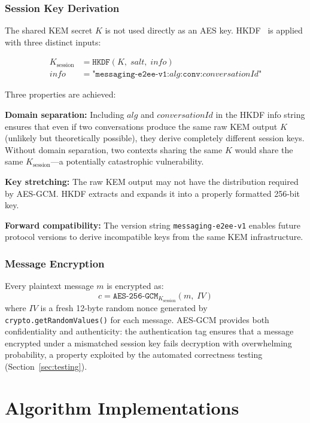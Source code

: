 \documentclass[12pt,a4paper]{report}
\begin{document}
\subsection{Session Key Derivation}

The shared KEM secret $K$ is not used directly as an AES key. HKDF~\cite{webcrypto}
is applied with three distinct inputs:

\begin{align}
K_{\text{session}} &= \texttt{HKDF}(K,\; \mathit{salt},\; \mathit{info}) \\
\mathit{info} &= \texttt{"messaging-e2ee-v1:}\mathit{alg}\texttt{:conv:}\mathit{conversationId}\texttt{"}
\end{align}

Three properties are achieved:

\textbf{Domain separation:} Including $\mathit{alg}$ and $\mathit{conversationId}$ in
the HKDF info string ensures that even if two conversations produce the same raw KEM
output $K$ (unlikely but theoretically possible), they derive completely different
session keys. Without domain separation, two contexts sharing the same $K$ would share
the same $K_{\text{session}}$---a potentially catastrophic vulnerability.

\textbf{Key stretching:} The raw KEM output may not have the distribution required by
AES-GCM. HKDF extracts and expands it into a properly formatted 256-bit key.

\textbf{Forward compatibility:} The version string \texttt{messaging-e2ee-v1} enables
future protocol versions to derive incompatible keys from the same KEM infrastructure.

\subsection{Message Encryption}

Every plaintext message $m$ is encrypted as:
\[
c = \texttt{AES-256-GCM}_{K_{\text{session}}}(m,\; IV)
\]
where $IV$ is a fresh 12-byte random nonce generated by \texttt{crypto.getRandomValues()}
for each message. AES-GCM provides both confidentiality and authenticity: the
authentication tag ensures that a message encrypted under a mismatched session key
fails decryption with overwhelming probability, a property exploited by the automated
correctness testing (Section~\ref{sec:testing}).

\chapter{Algorithm Implementations}
\end{document}
